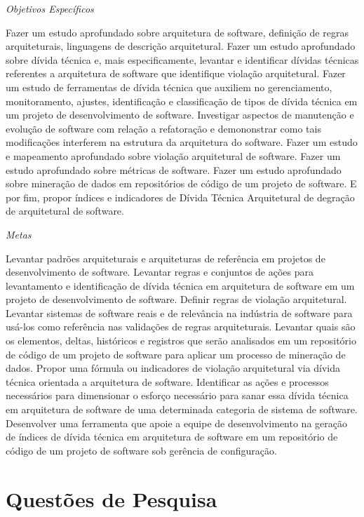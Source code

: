 \documentclass[
	12pt,				%
	openright,			%
	twoside,			%
	a4paper,			%
	english,			%
	french,				%
	spanish,			%
	brazil,				%
	]{abntex2}
\begin{document}
\emph{Objetivos Específicos }

Fazer um estudo aprofundado sobre arquitetura de software, definição
de regras arquiteturais, linguagens de descrição arquitetural. Fazer
um estudo aprofundado sobre dívida técnica e, mais especificamente,
levantar e identificar dívidas técnicas referentes a arquitetura de
software que identifique violação arquitetural. Fazer um estudo de
ferramentas de dívida técnica que auxiliem no gerenciamento, monitoramento,
ajustes, identificação e classificação de tipos de dívida técnica
em um projeto de desenvolvimento de software. Investigar aspectos
de manutenção e evolução de software com relação a refatoração e demononstrar
como tais modificações interferem na estrutura da arquitetura do software.
Fazer um estudo e mapeamento aprofundado sobre violação arquitetural
de software. Fazer um estudo aprofundado sobre métricas de software.
Fazer um estudo aprofundado sobre mineração de dados em repositórios
de código de um projeto de software. E por fim, propor índices e indicadores
de Dívida Técnica Arquitetural de degração de arquitetural de software.

\emph{Metas}

Levantar padrões arquiteturais e arquiteturas de referência em projetos
de desenvolvimento de software. Levantar regras e conjuntos de ações
para levantamento e identificação de dívida técnica em arquitetura
de software em um projeto de desenvolvimento de software. Definir
regras de violação arquitetural. Levantar sistemas de software reais
e de relevância na indústria de software para usá-los como referência
nas validações de regras arquiteturais. Levantar quais são os elementos,
deltas, históricos e registros que serão analisados em um repositório
de código de um projeto de software para aplicar um processo de mineração
de dados. Propor uma fórmula ou indicadores de violação arquitetural
via dívida técnica orientada a arquitetura de software. Identificar
as ações e processos necessários para dimensionar o esforço necessário
para sanar essa dívida técnica em arquitetura de software de uma determinada
categoria de sistema de software. Desenvolver uma ferramenta que apoie
a equipe de desenvolvimento na geração de índices de dívida técnica
em arquitetura de software em um repositório de código de um projeto
de software sob gerência de configuração. 

\chapter{Questões de Pesquisa}
\end{document}
